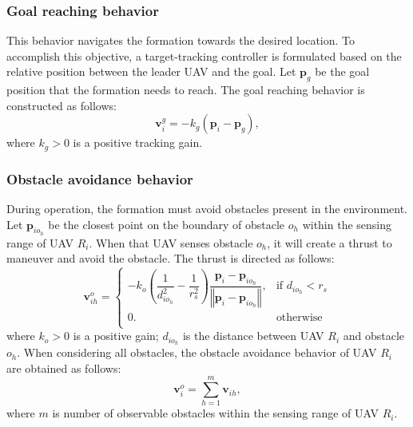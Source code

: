 \subsubsection{Goal reaching behavior}
This behavior navigates the formation towards the desired location. To accomplish this objective, a target-tracking controller is formulated based on the relative position between the leader UAV and the goal. Let $\mathbf{p}_g$ be the goal position that the formation needs to reach. The goal reaching behavior is constructed as follows: 
\begin{equation}
    \mathbf{v}_i^g=-k_g\left(\mathbf{p}_i - \mathbf{p}_g\right),
    \label{eqn:chap2_ug}
\end{equation}
where $k_g>0$ is a positive tracking gain.

\subsubsection{Obstacle avoidance behavior}
During operation, the formation must avoid obstacles present in the environment. Let $\mathbf{p}_{io_h}$ be the closest point on the boundary of obstacle $o_h$ within the sensing range of UAV $R_i$. When that UAV senses obstacle $o_h$, it will create a thrust to maneuver and avoid the obstacle. The thrust is directed as follows:
\begin{equation}
    \mathbf{v}_{ih}^{o}=\left\{ \begin{array}{cc}
-k_o\left(\dfrac{1}{d_{io_h}^2} - \dfrac{1}{r_s^2}\right)\dfrac{\mathbf{p}_i-\mathbf{p}_{io_h}}{\left\Vert \mathbf{p}_i-\mathbf{p}_{io_h}\right\Vert}, & \text{if } d_{io_h} < r_s\\
0. & \text{otherwise}\\
\end{array}\right.
\end{equation}
where $k_o>0$ is a positive gain; $d_{io_h}$ is the distance between UAV $R_i$ and obstacle $o_h$. When considering all obstacles, the obstacle avoidance behavior of UAV $R_i$ are obtained as follows:
\begin{equation}
    \mathbf{v}_i^o=\sum_{h=1}^m{\mathbf{v}_{ih}},
    \label{eqn:chap2_uo}
\end{equation}
where $m$ is number of observable obstacles within the sensing range of UAV $R_i$.


